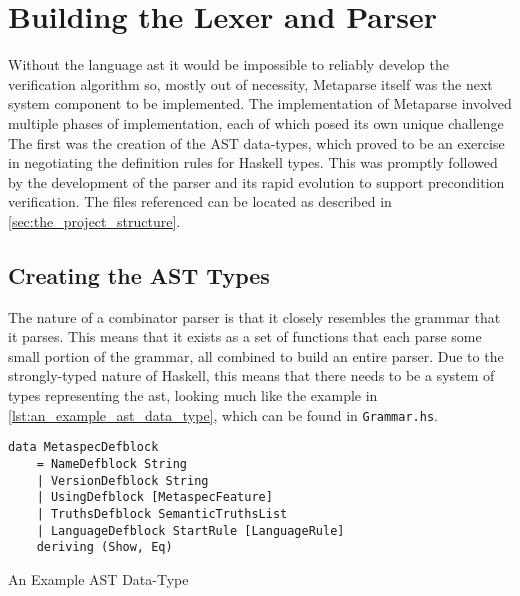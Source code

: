 
\section{Building the Lexer and Parser} %
\label{sec:building_the_lexer_and_parser}
Without the language \gls{ast} it would be impossible to reliably develop the verification algorithm so, mostly out of necessity, Metaparse itself was the next system component to be implemented. 
The implementation of Metaparse involved multiple phases of implementation, each of which posed its own unique challenge
The first was the creation of the AST data-types, which proved to be an exercise in negotiating the definition rules for Haskell types.
This was promptly followed by the development of the parser and its rapid evolution to support precondition verification.
The files referenced can be located as described in \autoref{sec:the_project_structure}.

\subsection{Creating the AST Types} %
\label{sub:creating_the_ast_types}
The nature of a combinator parser is that it closely resembles the grammar that it parses. 
This means that it exists as a set of functions that each parse some small portion of the grammar, all combined to build an entire parser. 
Due to the strongly-typed nature of Haskell, this means that there needs to be a system of types representing the \gls{ast}, looking much like the example in \autoref{lst:an_example_ast_data_type}, which can be found in \texttt{Grammar.hs}.\\

\begin{listing}[!htb]
\begin{verbatim}
data MetaspecDefblock
    = NameDefblock String
    | VersionDefblock String
    | UsingDefblock [MetaspecFeature]
    | TruthsDefblock SemanticTruthsList
    | LanguageDefblock StartRule [LanguageRule]
    deriving (Show, Eq)    
\end{verbatim}
\caption{An Example AST Data-Type}
\label{lst:an_example_ast_data_type}
\end{listing}

